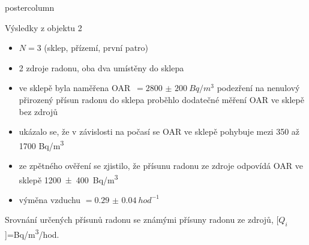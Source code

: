 \documentclass{beamer}
\begin{document}
\begin{frame}
\begin{columns}
\begin{column}{.57\textwidth}
\begin{beamercolorbox}[center]{postercolumn}
\begin{minipage}{.98\textwidth}
{\begin{myblock}{Výsledky z objektu 2}
    \begin{itemize}
        \item $N=3$ (sklep, přízemí, první patro)
        \item 2 zdroje radonu, oba dva umístěny do sklepa
        \item ve sklepě byla naměřena OAR~$=\SI{2800(200)}{Bq/m^3}$ \textrightarrow{} podezření na nenulový přirozený přísun radonu do sklepa \textrightarrow{} proběhlo dodatečné měření OAR ve sklepě bez zdrojů
        \item ukázalo se, že v závislosti na počasí se OAR ve sklepě pohybuje mezi 350 až 1700 \si{Bq/m^3}
        \item ze zpětného ověření se zjistilo, že přísunu radonu ze zdroje odpovídá OAR ve sklepě \SI{1200(400)}{Bq/m^3}
        \item výměna vzduchu $=\SI{0.29(4)}{hod^{-1}}$
    \end{itemize}
        \begin{table}
            \centering
            \scriptsize
            \caption{Srovnání určených přísunů radonu se známými přísuny radonu ze zdrojů, [$Q_i$]=\si{Bq/m^3/hod}.}
            \label{tab:prisuny_anglicka574}
            
        \end{table}
\end{myblock}\vfill

}
\end{minipage}
\end{beamercolorbox}
\end{column}
\end{columns}
\end{frame}
\end{document}
